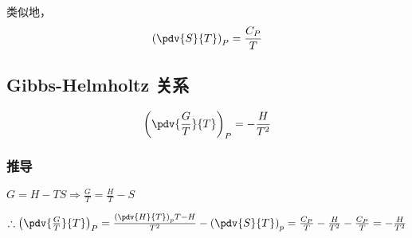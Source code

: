 类似地，
\begin{equation}
\left(\pdv{S}{T}\right)_P=\frac{C_P}{T}
\end{equation}

\subsection{Gibbs-Helmholtz 关系}
\begin{equation}
\left(\pdv{\frac{G}{T}}{T}\right)_P=-\frac{H}{T^2}
\end{equation}

\subsubsection{推导}
$G=H-TS \Rightarrow \frac{G}{T} = \frac{H}{T} - S$

$\therefore \left(\pdv{\frac{G}{T}}{T}\right)_P=\frac{\left(\pdv{H}{T}\right)_pT-H}{T^2} - \left(\pdv{S}{T}\right)_p = \frac{C_P}{T} - \frac{H}{T^2} - \frac{C_P}{T} = - \frac{H}{T^2}$
